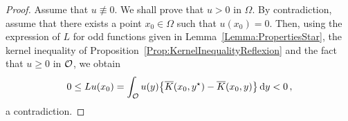 \begin{proof}
Assume that $u \not \equiv 0$. We shall prove that $u > 0$ in $\Omega$. By contradiction, assume
that there exists a point $x_0\in \Omega$ such that $u(x_0)= 0$. Then, using the expression of $L$
for odd functions given in Lemma~\ref{Lemma:PropertiesStar}, the kernel inequality of	
Proposition~\ref{Prop:KernelInequalityReflexion} and the fact that $u\geq 0$ in $\mathcal{O}$, we obtain
$$
0 \leq Lu(x_0) = \int_{\mathcal{O}} u(y)\big \{\overline{K}(x_0, y^\star) - \overline{K}(x_0, y) \big \}\,\mathrm{d} y < 0\,,
$$
a contradiction.
\end{proof}


